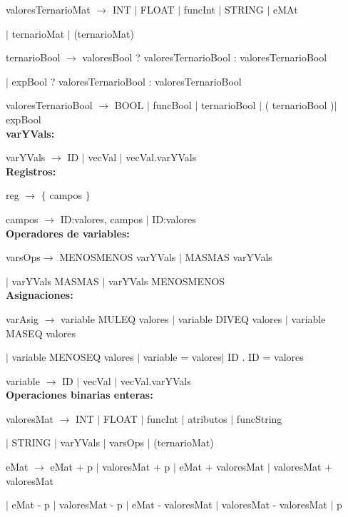 valoresTernarioMat $\rightarrow$ INT $|$ FLOAT $|$ funcInt $|$ STRING $|$ eMAt 

\hspace{15mm}$|$ ternarioMat $|$ (ternarioMat)

ternarioBool $\rightarrow$ valoresBool ? valoresTernarioBool : valoresTernarioBool  

\hspace{15mm}$|$ expBool ? valoresTernarioBool : valoresTernarioBool
  
valoresTernarioBool $\rightarrow$ BOOL $|$ funcBool $|$ ternarioBool $|$ ( ternarioBool )$|$ expBool \\
   

\textbf{varYVals:}

varYVals $\rightarrow$ ID $|$ vecVal $|$ vecVal.varYVals \\


\textbf{Registros:} 

reg $\rightarrow$ $\{$ campos $\}$

campos $\rightarrow$ ID:valores, campos $|$ ID:valores \\


\textbf{Operadores de variables:}

varsOps$\rightarrow$ MENOSMENOS varYVals $|$ MASMAS varYVals

\hspace{15mm}$|$ varYVals MASMAS $|$ varYVals MENOSMENOS \\


\textbf{Asignaciones:} 

  varAsig $\rightarrow$ variable MULEQ valores $|$ variable DIVEQ valores $|$ variable MASEQ valores
  
  \hspace{15mm}$|$ variable MENOSEQ valores $|$ variable = valores$|$ ID . ID = valores 


variable $\rightarrow$ ID $|$ vecVal $|$ vecVal.varYVals  \\


\textbf{Operaciones binarias enteras:} 

 valoresMat $\rightarrow$ INT $|$ FLOAT $|$ funcInt $|$ atributos $|$ funcString
 
  \hspace{15mm} $|$ STRING $|$ varYVals $|$ varsOps $|$ (ternarioMat)  
  
 
eMat $\rightarrow$ eMat + p $|$ valoresMat + p $|$ eMat + valoresMat $|$ valoresMat + valoresMat
  
  \hspace{15mm} $|$ eMat - p  $|$ valoresMat - p  $|$ eMat - valoresMat $|$ valoresMat - valoresMat $|$ p
  
